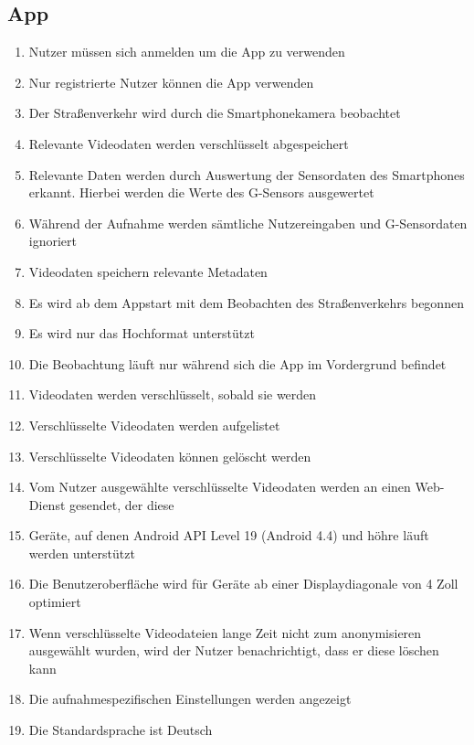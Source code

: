 \subsection{App}
	\begin{enumerate}
	\renewcommand{\labelenumi}{\textbf{\theenumi}}
	\renewcommand{\theenumi}{PK\arabic{enumi}0}
	\setcounter{enumi}{99}
	\item Nutzer müssen sich anmelden um die \gls{App} zu verwenden
	\item Nur registrierte Nutzer können die \gls{App} verwenden
	\item Der Straßenverkehr wird durch die \gls{Smartphone}kamera beobachtet 
	\item Relevante Videodaten werden verschlüsselt abgespeichert
	\item Relevante Daten werden durch Auswertung der Sensordaten des \glspl{Smartphone} erkannt. Hierbei werden die Werte des G-Sensors ausgewertet
	\item Während der Aufnahme werden sämtliche Nutzereingaben und \gls{G-Sensor}daten ignoriert
	\item Videodaten speichern relevante \gls{Metadaten}
	\item Es wird ab dem \gls{App}start mit dem Beobachten des Straßenverkehrs begonnen
	\item Es wird nur das Hochformat unterstützt
	\item Die Beobachtung läuft nur während sich die \gls{App} im Vordergrund befindet
	\item Videodaten werden verschlüsselt, sobald sie  werden
	\item Verschlüsselte Videodaten werden aufgelistet
	\item Verschlüsselte Videodaten können gelöscht werden
	\item Vom Nutzer ausgewählte verschlüsselte Videodaten werden an einen \gls{Web-Dienst} gesendet, der diese 
	\item Geräte, auf denen \gls{Android} \gls{API} Level 19 (Android 4.4) und höhre läuft werden unterstützt
	\item Die Benutzeroberfläche wird für Geräte ab einer Displaydiagonale von 4 Zoll optimiert
	\item Wenn verschlüsselte Videodateien lange Zeit nicht zum \gls{anonymisieren} ausgewählt wurden, wird der Nutzer benachrichtigt, dass er diese löschen kann
	\item Die aufnahmespezifischen Einstellungen werden angezeigt
	\item Die Standardsprache ist Deutsch
	\end{enumerate}
